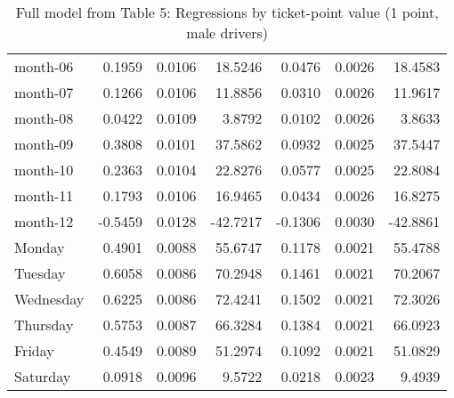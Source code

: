 \documentclass[10pt]{article}
\begin{document}
\begin{table}[ht]
\begin{tabular}{lrrrrrr}
  month-06 & 0.1959 & 0.0106 & 18.5246 & 0.0476 & 0.0026 & 18.4583 \\ 
  month-07 & 0.1266 & 0.0106 & 11.8856 & 0.0310 & 0.0026 & 11.9617 \\ 
  month-08 & 0.0422 & 0.0109 & 3.8792 & 0.0102 & 0.0026 & 3.8633 \\ 
  month-09 & 0.3808 & 0.0101 & 37.5862 & 0.0932 & 0.0025 & 37.5447 \\ 
  month-10 & 0.2363 & 0.0104 & 22.8276 & 0.0577 & 0.0025 & 22.8084 \\ 
  month-11 & 0.1793 & 0.0106 & 16.9465 & 0.0434 & 0.0026 & 16.8275 \\ 
  month-12 & -0.5459 & 0.0128 & -42.7217 & -0.1306 & 0.0030 & -42.8861 \\ 
  Monday & 0.4901 & 0.0088 & 55.6747 & 0.1178 & 0.0021 & 55.4788 \\ 
  Tuesday & 0.6058 & 0.0086 & 70.2948 & 0.1461 & 0.0021 & 70.2067 \\ 
  Wednesday & 0.6225 & 0.0086 & 72.4241 & 0.1502 & 0.0021 & 72.3026 \\ 
  Thursday & 0.5753 & 0.0087 & 66.3284 & 0.1384 & 0.0021 & 66.0923 \\ 
  Friday & 0.4549 & 0.0089 & 51.2974 & 0.1092 & 0.0021 & 51.0829 \\ 
  Saturday & 0.0918 & 0.0096 & 9.5722 & 0.0218 & 0.0023 & 9.4939 \\ 
   \hline
\end{tabular}
\caption{Full model from Table 5: Regressions by ticket-point value (1 point, male drivers)} 
\label{tab_5_1_pts_no_age_M}
\end{table}


\clearpage
\pagebreak



\end{document}
